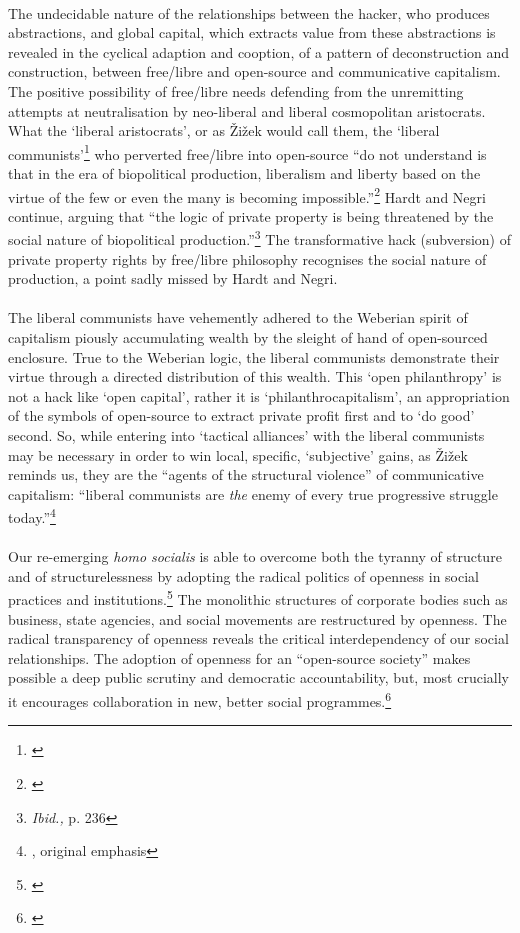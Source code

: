 \documentclass[11pt,titlepage]{book}
\begin{document}
\paragraph{}The undecidable nature of the relationships between the hacker, who produces abstractions, and global capital, which extracts value from these abstractions is revealed in the cyclical adaption and cooption, of a pattern of deconstruction and construction, between free/libre and open-source and communicative capitalism. The positive possibility of free/libre needs defending from the unremitting attempts at neutralisation by neo-liberal and liberal cosmopolitan aristocrats. What the `liberal aristocrats', or as \v{Z}i\v{z}ek would call them, the `liberal communists'\footnote{\cite{Zizek:2006vile}} who perverted free/libre into open-source ``do not understand is that in the era of biopolitical production, liberalism and liberty based on the virtue of the few or even the many is becoming impossible.''\footnote{\cite[p. 236]{Hardt:2005zt}} Hardt and Negri continue, arguing that ``the logic of private property is being threatened by the social nature of biopolitical production.''\footnote{\textit{Ibid.,} p. 236} The transformative hack (subversion) of private property rights by free/libre philosophy recognises the social nature of production, a point sadly missed by Hardt and Negri.

\paragraph{}The liberal communists have vehemently adhered to the Weberian spirit of capitalism piously accumulating wealth by the sleight of hand of open-sourced enclosure. True to the Weberian logic, the liberal communists demonstrate their virtue through a directed distribution of this wealth. This `open philanthropy' is not a hack like `open capital', rather it is `philanthrocapitalism', an appropriation of the symbols of open-source to extract private profit first and to `do good' second. So, while entering into `tactical alliances' with the liberal communists may be necessary in order to win local, specific, `subjective' gains, as \v{Z}i\v{z}ek reminds us, they are the ``agents of the structural violence'' of communicative capitalism: ``liberal communists are \textit{the} enemy of every true progressive struggle today.''\footnote{\cite{Zizek:2006vile}, original emphasis}

\paragraph{}Our re-emerging \textit{homo socialis} is able to overcome both the tyranny of structure and of structurelessness by adopting the radical politics of openness in social practices and institutions.\footnote{\cite{Freeman:1970}} The monolithic structures of corporate bodies such as business, state agencies, and social movements are restructured by openness. The radical transparency of openness reveals the critical interdependency of our social relationships. The adoption of openness for an ``open-source society'' makes possible a deep public scrutiny and democratic accountability, but, most crucially it encourages collaboration in new, better social programmes.\footnote{\cite[pp. 339-40]{Hardt:2005zt}}
\skip
\end{document}

